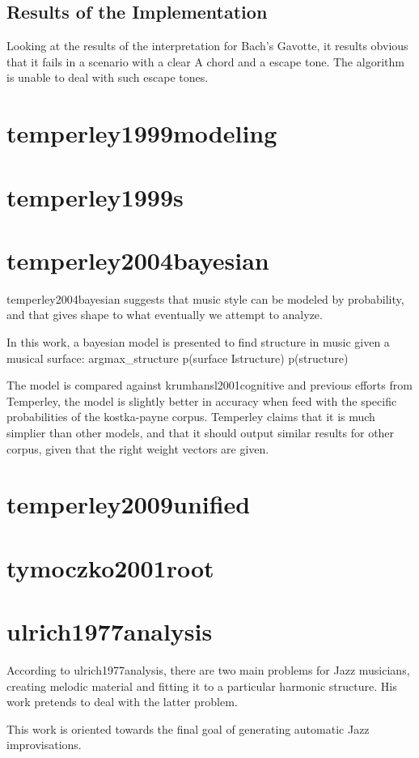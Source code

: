 		\subsection{Results of the Implementation}
		Looking at the results of the interpretation for Bach's Gavotte, it results obvious that it fails in a scenario with a clear A chord and a escape tone. The algorithm is unable to deal with such escape tones.
	\section{temperley1999modeling }
	\section{temperley1999s }
	\section{temperley2004bayesian }
		temperley2004bayesian suggests that music style can be modeled by probability, and that gives shape to what eventually we attempt to analyze.

		In this work, a bayesian model is presented to find structure in music given a musical surface: argmax_structure p(surface Istructure) p(structure)

		The model is compared against krumhansl2001cognitive and previous efforts from Temperley, the model is slightly better in accuracy when feed with the specific probabilities of the kostka-payne corpus. Temperley claims that it is much simplier than other models, and that it should output similar results for other corpus, given that the right weight vectors are given.
	\section{temperley2009unified }
	\section{tymoczko2001root }
	\section{ulrich1977analysis }
		According to ulrich1977analysis, there are two main problems for Jazz musicians, creating melodic material and fitting it to a particular harmonic structure. His work pretends to deal with the latter problem.

		This work is oriented towards the final goal of generating automatic Jazz improvisations.

